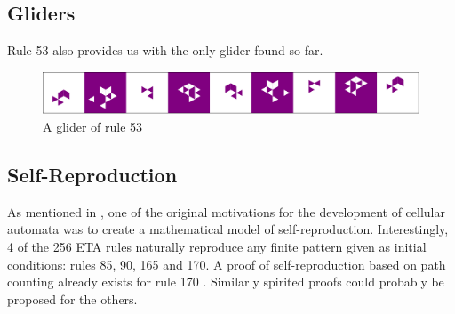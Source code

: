 \documentclass{article}
\begin{document}
\bigskip 

\subsection{Gliders} \label{gliders}
Rule 53 also provides us with the only glider found so far.

\begin{figure}[H]
    \centering
        \includegraphics[width=1\textwidth]{graphics/behavior/gliders/glider.pdf}
    \caption{A glider of rule 53}
    \label{fig:glider}
\end{figure}

\pagebreak
\subsection{Self-Reproduction} \label{self-reproduction}

As mentioned in \cite{saadatCopyMachinesSelfreproduction2023}, one of the original motivations for the development of cellular automata was to create a mathematical model of self-reproduction. Interestingly, 4 of the 256 ETA rules naturally reproduce any finite pattern given as initial conditions: rules 85, 90, 165 and 170. A proof of self-reproduction based on path counting already exists for rule 170 \cite{saadatCopyMachinesSelfreproduction2023}. Similarly spirited proofs could probably be proposed for the others.

\vspace{.6cm}
\end{document}
